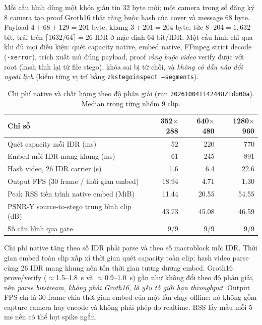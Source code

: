 \documentclass[11pt,a4paper]{article}
\renewcommand{\_}{\origunderscore\allowbreak}
\begin{document}
Mỗi cấu hình dùng một khóa giấu tin 32 byte mới; một camera trong sổ đăng ký 8 camera tạo proof Groth16 thật ràng buộc hash của cover và message 68 byte. Payload $4+68+129=201$ byte, khung $3+201=204$ byte, tức $8\cdot204=1{,}632$ bit, trải trên $\lceil1632/64\rceil=26$ IDR ở mặc định 64 bit/IDR. Một cấu hình chỉ qua khi đủ mọi điều kiện: quét capacity native, embed native, FFmpeg strict decode (\texttt{-xerror}), trích xuất mù đúng payload, proof \emph{ràng buộc video} verify được với root (hash tính lại từ file stego), khóa sai bị từ chối, và \emph{không có dấu nào đổi ngoài lịch} (kiểm từng vị trí bằng \texttt{zkstego\_inspect --segments}).

\begin{table}[H]\centering\small
\caption{Chi phí native và chất lượng theo độ phân giải (run \texttt{20261004T142448Z\_1db00a}). Median trong từng nhóm 9 clip.}
\begin{tabular}{lrrr}\toprule
Chỉ số & 352$\times$288 & 640$\times$480 & 1280$\times$960\\\midrule
Quét capacity mỗi IDR (ms) & 52 & 220 & 770\\
Embed mỗi IDR mang khung (ms) & 61 & 245 & 891\\
Hash video, 26 IDR carrier (s) & 1.6 & 6.4 & 22.6\\
Output FPS (30 frame / thời gian embed) & 18.94 & 4.71 & 1.30\\
Peak RSS tiến trình native embed (MiB) & 11.44 & 20.55 & 54.55\\
PSNR-Y source-to-stego trung bình clip (dB) & 43.73 & 45.08 & 46.59\\
Số cấu hình qua gate & 9/9 & 9/9 & 9/9\\
\bottomrule\end{tabular}
\end{table}
Chi phí native tăng theo số IDR phải parse và theo số macroblock mỗi IDR. Thời gian embed toàn clip xấp xỉ thời gian quét capacity toàn clip; hash video parse cùng 26 IDR mang khung nên tốn thời gian tương đương embed. Groth16 prove/verify ($\approx$1.5--1.8~s và $\approx$0.9--1.0~s) gần như không đổi theo độ phân giải, nên \emph{parse bitstream, không phải Groth16, là yếu tố giới hạn throughput}. Output FPS chỉ là 30 frame chia thời gian embed của một lần chạy offline; nó không gồm capture camera hay encode và không phải phép đo realtime. RSS lấy mẫu mỗi 5 ms nên có thể hụt spike ngắn.
\end{document}
